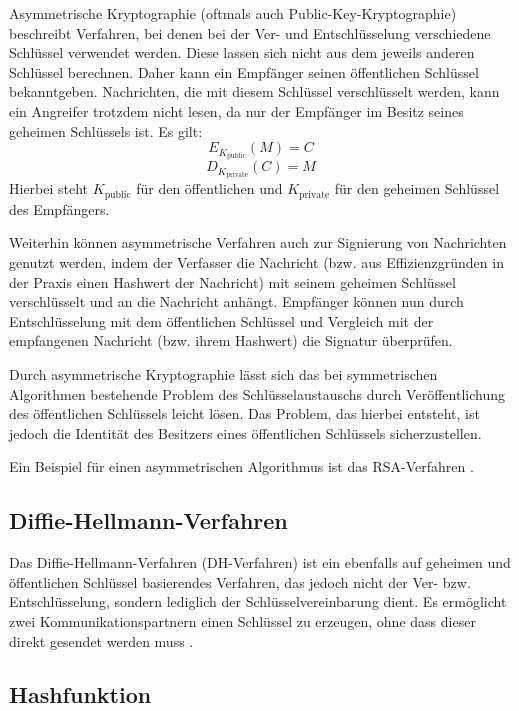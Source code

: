 Asymmetrische Kryptographie (oftmals auch Public-Key-Kryptographie) beschreibt Verfahren, bei denen bei der Ver- und Entschlüsselung verschiedene Schlüssel verwendet werden. Diese lassen sich nicht aus dem jeweils anderen Schlüssel berechnen. Daher kann ein Empfänger seinen öffentlichen Schlüssel bekanntgeben. Nachrichten, die mit diesem Schlüssel verschlüsselt werden, kann ein Angreifer trotzdem nicht lesen, da nur der Empfänger im Besitz seines geheimen Schlüssels ist. Es gilt: 
\[E_{K_{\text{public}}}(M)=C\] 
\[D_{K_{\text{private}}}(C)=M\] 
Hierbei steht \(K_{\text{public}}\) für den öffentlichen und \(K_{\text{private}}\) für den geheimen Schlüssel des Empfängers.

Weiterhin können asymmetrische Verfahren auch zur Signierung von Nachrichten genutzt werden, indem der Verfasser die Nachricht (bzw. aus Effizienzgründen in der Praxis einen Hashwert der Nachricht) mit seinem geheimen Schlüssel verschlüsselt und an die Nachricht anhängt. Empfänger können nun durch Entschlüsselung mit dem öffentlichen Schlüssel und Vergleich mit der empfangenen Nachricht (bzw. ihrem Hashwert) die Signatur überprüfen.

Durch asymmetrische Kryptographie lässt sich das bei symmetrischen Algorithmen bestehende Problem des Schlüsselaustauschs durch Veröffentlichung des öffentlichen Schlüssels leicht lösen. Das Problem, das hierbei entsteht, ist jedoch die Identität des Besitzers eines öffentlichen Schlüssels sicherzustellen.

Ein Beispiel für einen asymmetrischen Algorithmus ist das RSA-Verfahren \cite{Schneier2006}.

\subsection{Diffie-Hellmann-Verfahren}

\label{sec_diffie_hellman}

Das Diffie-Hellmann-Verfahren (DH-Verfahren) ist ein ebenfalls auf geheimen und öffentlichen Schlüssel basierendes Verfahren, das jedoch nicht der Ver- bzw. Entschlüsselung, sondern lediglich der Schlüsselvereinbarung dient. Es ermöglicht zwei Kommunikationspartnern einen Schlüssel zu erzeugen, ohne dass dieser direkt gesendet werden muss \cite{Schneier2006}. 


\subsection{Hashfunktion}

